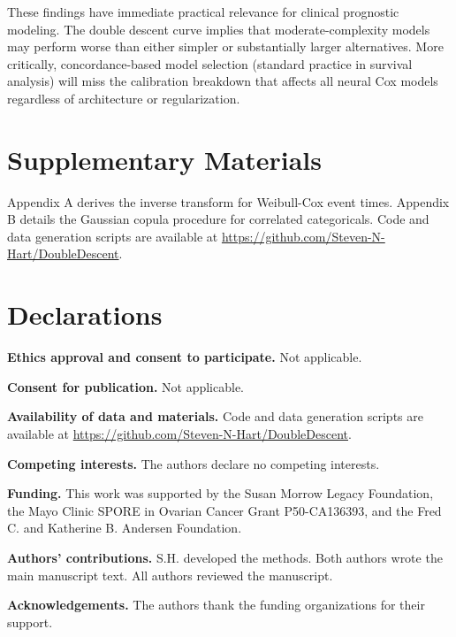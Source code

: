 \documentclass[12pt,a4paper]{article}
\begin{document}
These findings have immediate practical relevance for clinical prognostic modeling. The double descent curve implies that moderate-complexity models may perform worse than either simpler or substantially larger alternatives. More critically, concordance-based model selection (standard practice in survival analysis) will miss the calibration breakdown that affects all neural Cox models regardless of architecture or regularization.

\section*{Supplementary Materials}

Appendix A derives the inverse transform for Weibull-Cox event times. Appendix B details the Gaussian copula procedure for correlated categoricals. Code and data generation scripts are available at \url{https://github.com/Steven-N-Hart/DoubleDescent}.


\section*{Declarations}

\textbf{Ethics approval and consent to participate.} Not applicable.

\textbf{Consent for publication.} Not applicable.

\textbf{Availability of data and materials.} Code and data generation scripts are available at \url{https://github.com/Steven-N-Hart/DoubleDescent}.

\textbf{Competing interests.} The authors declare no competing interests.

\textbf{Funding.} This work was supported by the Susan Morrow Legacy Foundation, the Mayo Clinic SPORE in Ovarian Cancer Grant P50-CA136393, and the Fred C. and Katherine B. Andersen Foundation.

\textbf{Authors' contributions.} S.H. developed the methods. Both authors wrote the main manuscript text. All authors reviewed the manuscript.

\textbf{Acknowledgements.} The authors thank the funding organizations for their support.
\end{document}
